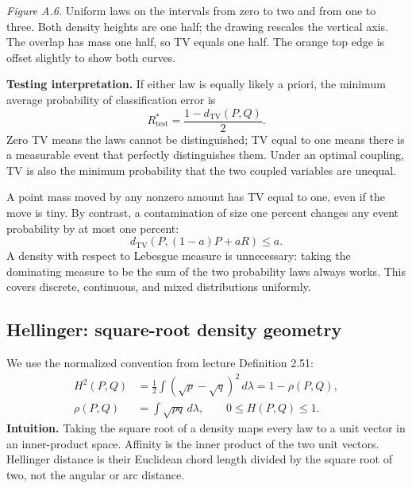 \documentclass[12pt]{article}
\begin{document}
\begin{center}
\end{center}
\textit{Figure A.6.} Uniform laws on the intervals from zero to two and from
one to three. Both density heights are one half; the drawing rescales the
vertical axis. The overlap has mass one half, so TV equals one half.
The orange top edge is offset slightly to show both curves.

\textbf{Testing interpretation.} If either law is equally likely a priori,
the minimum average probability of classification error is
\begin{equation}
 R_{\mathrm{test}}^*=\frac{1-d_{\mathrm{TV}}(P,Q)}2.
\end{equation}
Zero TV means the laws cannot be distinguished; TV equal to one means
there is a measurable event that perfectly distinguishes them. Under an
optimal coupling, TV is also the minimum probability that the two coupled
variables are unequal.

A point mass moved by any nonzero amount has TV equal to one, even if the
move is tiny. By contrast, a contamination of size one percent changes any
event probability by at most one percent:
\begin{equation}
 d_{\mathrm{TV}}(P,(1-a)P+aR)\le a.
\end{equation}
A density with respect to Lebesgue measure is unnecessary: taking the
dominating measure to be the sum of the two probability laws always works.
This covers discrete, continuous, and mixed distributions uniformly.

\clearpage
\begingroup\small
\subsection{Hellinger: square-root density geometry}
We use the normalized convention from lecture Definition 2.51:
\begin{align}
 H^2(P,Q)&=\frac12\int(\sqrt p-\sqrt q)^2\,d\lambda
 =1-\rho(P,Q),\\
 \rho(P,Q)&=\int\sqrt{pq}\,d\lambda,\qquad 0\le H(P,Q)\le1.
\end{align}
\textbf{Intuition.} Taking the square root of a density maps every law to
a unit vector in an inner-product space. Affinity is the inner product of
the two unit vectors. Hellinger distance is their Euclidean chord length
divided by the square root of two, not the angular or arc distance.
\end{document}
